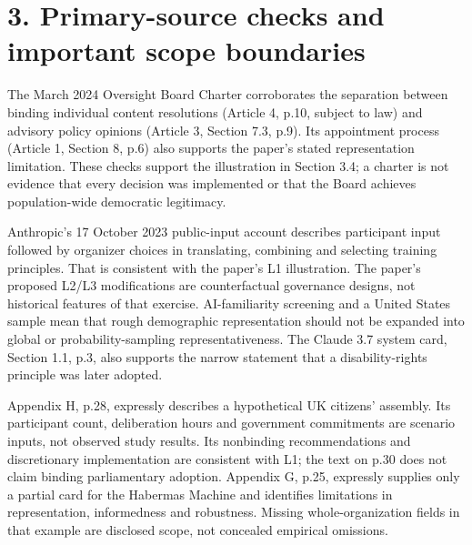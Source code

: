 \documentclass[10pt]{article}
\begin{document}
\section*{3. Primary-source checks and important scope boundaries}
The March 2024 Oversight Board Charter corroborates the separation between binding individual content resolutions (Article 4, p.10, subject to law) and advisory policy opinions (Article 3, Section 7.3, p.9). Its appointment process (Article 1, Section 8, p.6) also supports the paper’s stated representation limitation. These checks support the illustration in Section 3.4; a charter is not evidence that every decision was implemented or that the Board achieves population-wide democratic legitimacy.\par
Anthropic’s 17 October 2023 public-input account describes participant input followed by organizer choices in translating, combining and selecting training principles. That is consistent with the paper’s L1 illustration. The paper’s proposed L2/L3 modifications are counterfactual governance designs, not historical features of that exercise. AI-familiarity screening and a United States sample mean that rough demographic representation should not be expanded into global or probability-sampling representativeness. The Claude 3.7 system card, Section 1.1, p.3, also supports the narrow statement that a disability-rights principle was later adopted.\par
Appendix H, p.28, expressly describes a hypothetical UK citizens’ assembly. Its participant count, deliberation hours and government commitments are scenario inputs, not observed study results. Its nonbinding recommendations and discretionary implementation are consistent with L1; the text on p.30 does not claim binding parliamentary adoption. Appendix G, p.25, expressly supplies only a partial card for the Habermas Machine and identifies limitations in representation, informedness and robustness. Missing whole-organization fields in that example are disclosed scope, not concealed empirical omissions.\par
\end{document}
